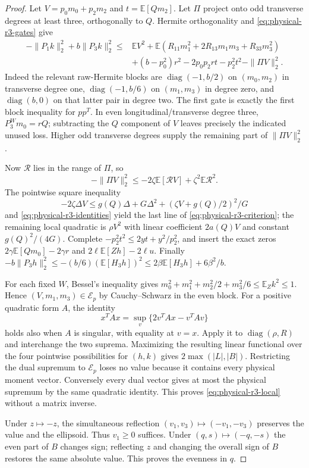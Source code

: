 \begin{proof}
Let $V=p_0m_0+p_2m_2$ and $t=\mathbb E[Qm_2]$.
Let $\Pi$ project onto odd transverse degrees at least three,
orthogonally to $Q$.  Hermite orthogonality and
\eqref{eq:physical-r3-gates} give
\begin{align*}
 -\|P_1k\|_2^2+b\|P_3k\|_2^2
 \leq{}&\mathbb EV^2+
 \mathbb E(R_{11}m_1^2+2R_{13}m_1m_3+R_{33}m_3^2)\\
 &+(b-p_0^2)r^2-2p_0p_2rt-p_2^2t^2-\|\Pi V\|_2^2.
\end{align*}
Indeed the relevant raw-Hermite blocks are
$\operatorname{diag}(-1,b/2)$ on $(m_0,m_2)$ in transverse degree one,
$\operatorname{diag}(-1,b/6)$ on $(m_1,m_3)$ in degree zero, and
$\operatorname{diag}(b,0)$ on that latter pair in degree two.
The first gate is exactly the first block inequality for $pp^T$.
In even longitudinal/transverse degree three,
$P_3^Wm_0=rQ$; subtracting the $Q$ component of $V$ leaves precisely
the indicated unused loss.  Higher odd transverse degrees supply the
remaining part of $\|\Pi V\|_2^2$.

Now $\mathcal R$ lies in the range of $\Pi$, so
\[
 -\|\Pi V\|_2^2\leq-2\zeta\mathbb E[\mathcal RV]
                          +\zeta^2\mathbb E\mathcal R^2.
\]
The pointwise square inequality
\[
 -2\zeta\Delta V\leq g(Q)\Delta+G\Delta^2+
                    (\zeta V+g(Q)/2)^2/G
\]
and \eqref{eq:physical-r3-identities} yield the last line of
\eqref{eq:physical-r3-criterion}; the remaining local quadratic is
$\rho V^2$ with linear coefficient $2a(Q)V$ and constant $g(Q)^2/(4G)$.
Complete $-p_2^2t^2\leq2yt+y^2/p_2^2$, and insert the exact zeros
$2\gamma\mathbb E[Qm_0]-2\gamma r$ and
$2\ell\mathbb E[Zh]-2\ell u$.
Finally
$-b\|P_3h\|_2^2\leq-(b/6)(\mathbb E[H_3h])^2
\leq2\beta\mathbb E[H_3h]+6\beta^2/b$.

For each fixed $W$, Bessel's inequality gives
$m_0^2+m_1^2+m_2^2/2+m_3^2/6\leq\mathbb E_Zk^2\leq1$.
Hence $(V,m_1,m_3)\in\mathcal E_p$ by Cauchy--Schwarz in the even block.
For a positive quadratic form $A$, the identity
\[
 x^TAx=\sup_v\{2v^TAx-v^TAv\}
\]
holds also when $A$ is singular, with equality at $v=x$.
Apply it to $\operatorname{diag}(\rho,R)$ and interchange the two
suprema.  Maximizing the resulting linear functional over the four
pointwise possibilities for $(h,k)$ gives $2\max(|L|,|B|)$.
Restricting the dual supremum to $\mathcal E_p$ loses no value because
it contains every physical moment vector.  Conversely every dual vector
gives at most the physical supremum by the same quadratic identity.
This proves \eqref{eq:physical-r3-local} without a matrix inverse.

Under $z\mapsto-z$, the simultaneous reflection
$(v_1,v_3)\mapsto(-v_1,-v_3)$ preserves the value and the ellipsoid.
Thus $v_1\geq0$ suffices.  Under $(q,s)\mapsto(-q,-s)$ the even part
of $B$ changes sign; reflecting $z$ and changing the overall sign
of $B$ restores the same absolute value.  This proves the evenness in $q$.
\end{proof}

